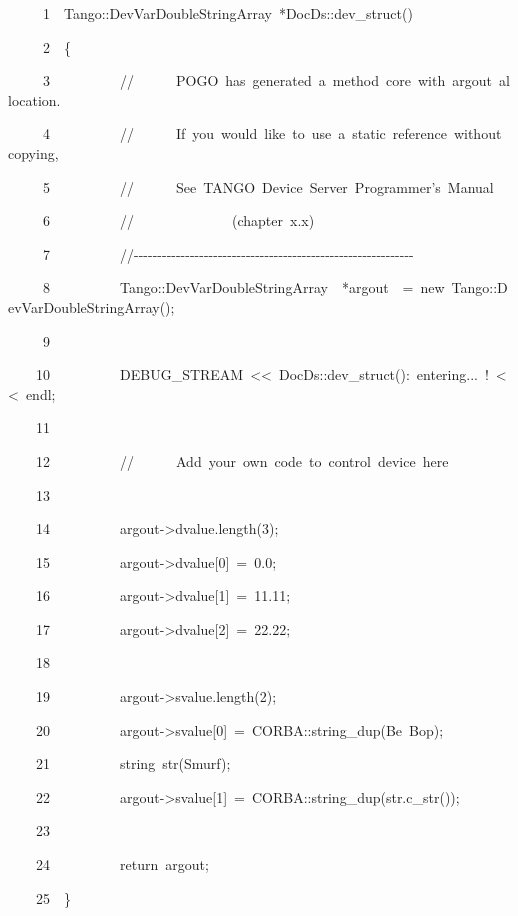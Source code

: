 
\begin{lyxcode}
~~~~~1~~Tango::DevVarDoubleStringArray~{*}DocDs::dev\_struct()

~~~~~2~~\{

~~~~~3~~~~~~~~~~//~~~~~~POGO~has~generated~a~method~core~with~argout~allocation.

~~~~~4~~~~~~~~~~//~~~~~~If~you~would~like~to~use~a~static~reference~without~copying,

~~~~~5~~~~~~~~~~//~~~~~~See~\textquotedbl{}TANGO~Device~Server~Programmer's~Manual\textquotedbl{}

~~~~~6~~~~~~~~~~//~~~~~~~~~~~~~~(chapter~x.x)

~~~~~7~~~~~~~~~~//-{}-{}-{}-{}-{}-{}-{}-{}-{}-{}-{}-{}-{}-{}-{}-{}-{}-{}-{}-{}-{}-{}-{}-{}-{}-{}-{}-{}-{}-{}-{}-{}-{}-{}-{}-{}-{}-{}-{}-{}-{}-{}-{}-{}-{}-{}-{}-{}-{}-{}-{}-{}-{}-{}-{}-{}-{}-{}-{}-

~~~~~8~~~~~~~~~~Tango::DevVarDoubleStringArray~~{*}argout~~=~new~Tango::DevVarDoubleStringArray();

~~~~~9~~

~~~~10~~~~~~~~~~DEBUG\_STREAM~<\textcompwordmark{}<~\textquotedbl{}DocDs::dev\_struct():~entering...~!\textquotedbl{}~<\textcompwordmark{}<~endl;

~~~~11~~~~~~~~~~

~~~~12~~~~~~~~~~//~~~~~~Add~your~own~code~to~control~device~here

~~~~13~~

~~~~14~~~~~~~~~~argout->dvalue.length(3);

~~~~15~~~~~~~~~~argout->dvalue{[}0{]}~=~0.0;

~~~~16~~~~~~~~~~argout->dvalue{[}1{]}~=~11.11;

~~~~17~~~~~~~~~~argout->dvalue{[}2{]}~=~22.22;

~~~~18~~~~~~~~~~

~~~~19~~~~~~~~~~argout->svalue.length(2);

~~~~20~~~~~~~~~~argout->svalue{[}0{]}~=~CORBA::string\_dup(\textquotedbl{}Be~Bop\textquotedbl{});

~~~~21~~~~~~~~~~string~str(\textquotedbl{}Smurf\textquotedbl{});

~~~~22~~~~~~~~~~argout->svalue{[}1{]}~=~CORBA::string\_dup(str.c\_str());

~~~~23~~~~~~~~~~

~~~~24~~~~~~~~~~return~argout;

~~~~25~~\}
\end{lyxcode}


